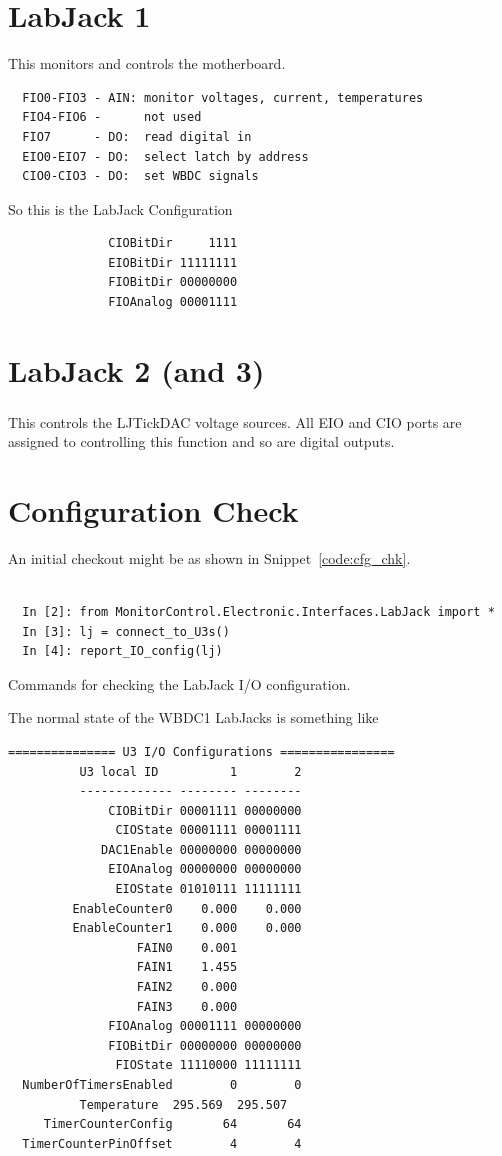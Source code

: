 \documentclass[letterpaper,11pt]{book}
\begin{document}
\section{LabJack 1}

This monitors and controls the motherboard.
\begin{verbatim}
  FIO0-FIO3 - AIN: monitor voltages, current, temperatures
  FIO4-FIO6 -      not used
  FIO7      - DO:  read digital in
  EIO0-EIO7 - DO:  select latch by address
  CIO0-CIO3 - DO:  set WBDC signals
\end{verbatim}
So this is the LabJack Configuration
\begin{verbatim}
              CIOBitDir     1111
              EIOBitDir 11111111
              FIOBitDir 00000000
              FIOAnalog 00001111
\end{verbatim}

\section{LabJack 2 (and 3)}

This controls the LJTickDAC\textsuperscript{\textregistered} voltage sources.
All EIO and CIO ports are assigned to controlling this function and so are
digital outputs.

\section{Configuration Check}\label{sec:cfg_chk}

An initial checkout might be as shown in Snippet~\ref{code:cfg_chk}.
\begin{code}[h!tb]
\begin{center}
\begin{verbatim}

  In [2]: from MonitorControl.Electronic.Interfaces.LabJack import *
  In [3]: lj = connect_to_U3s()
  In [4]: report_IO_config(lj)\end{verbatim}
\caption{\label{code:cfg_chk}Commands for checking the LabJack I/O
configuration.}
\end{center}
\end{code}
The normal state of the WBDC1 LabJacks is something like
\begin{verbatim}
=============== U3 I/O Configurations ================
          U3 local ID          1        2
          ------------- -------- --------
              CIOBitDir 00001111 00000000
               CIOState 00001111 00001111
             DAC1Enable 00000000 00000000
              EIOAnalog 00000000 00000000
               EIOState 01010111 11111111
         EnableCounter0    0.000    0.000
         EnableCounter1    0.000    0.000
                  FAIN0    0.001
                  FAIN1    1.455
                  FAIN2    0.000
                  FAIN3    0.000
              FIOAnalog 00001111 00000000
              FIOBitDir 00000000 00000000
               FIOState 11110000 11111111
  NumberOfTimersEnabled        0        0
          Temperature  295.569  295.507
     TimerCounterConfig       64       64
  TimerCounterPinOffset        4        4
\end{verbatim}
\end{document}

